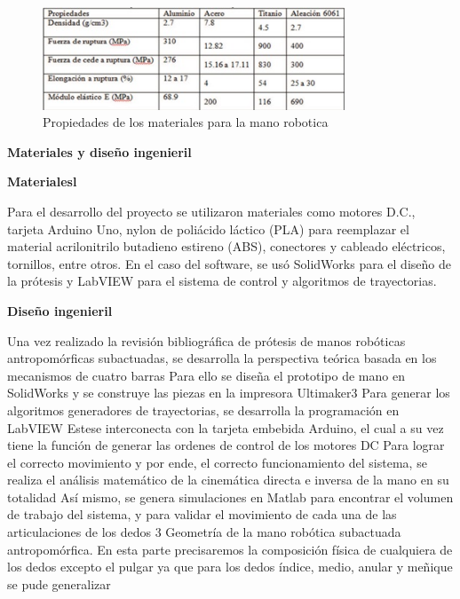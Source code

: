 \documentclass{article}
\begin{document}
\begin{figure} %
    \centering
    \includegraphics[width=90mm]{propiedades_protesis.jpg} %
    \caption{Propiedades de los materiales para la mano robotica}
    \label{grafica}
\end{figure}

\cite{serrezuela2018diseno} {\textbf{Materiales y diseño ingenieril}}
\item {\textbf{Materialesl}}
\item Para el desarrollo del proyecto se utilizaron materiales como motores D.C., tarjeta Arduino Uno, nylon de poliácido láctico (PLA) para reemplazar el material acrilonitrilo butadieno estireno (ABS), conectores   y cableado eléctricos, tornillos, entre otros. En el caso del software, se usó SolidWorks para el diseño de la prótesis y LabVIEW para el sistema de control y algoritmos de trayectorias.

\item {\textbf{Diseño ingenieril}}
\item Una vez realizado la revisión bibliográfica de prótesis de manos robóticas antropomórficas subactuadas, se desarrolla la  perspectiva  teórica basada en los mecanismos de cuatro barras   Para ello se diseña el prototipo de mano en SolidWorks y se construye las piezas en la impresora Ultimaker3 Para  generar  los  algoritmos generadores  de trayectorias, se desarrolla la programación en LabVIEW  Estese interconecta con la tarjeta embebida Arduino, el cual a su vez tiene la función de generar las ordenes de control de los motores DC  Para lograr el correcto movimiento y por ende, el correcto funcionamiento del sistema, se realiza el análisis matemático de la cinemática directa e inversa de la mano en su totalidad   Así  mismo,  se  genera  simulaciones  en Matlab para encontrar el volumen de trabajo del sistema, y para validar el movimiento de cada una de las articulaciones de los dedos 3 Geometría  de  la mano  robótica  subactuada antropomórfica. En  esta parte precisaremos  la composición  física  de cualquiera de los dedos excepto el pulgar ya que para los dedos  índice,  medio,  anular  y  meñique  se  pude generalizar  
\end{document}
